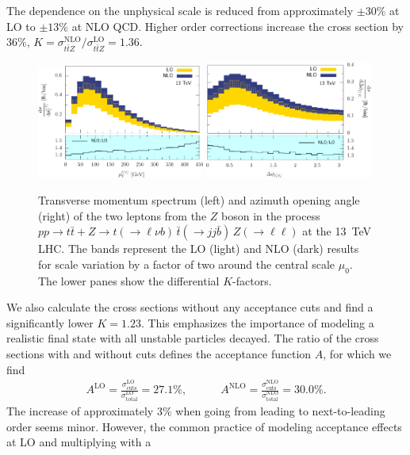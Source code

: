\documentclass{JHEP3}
\def\ttb{t\bar{t}}
\newcommand{\be}{\begin{eqnarray}}
\newcommand{\ee}{\end{eqnarray}}
\begin{document}
The dependence on the unphysical scale is reduced from approximately $\pm 30\%$ at LO to $\pm 13\%$ at NLO QCD.
Higher order corrections increase the cross section by 36\%, $K= \sigma_{\ttb Z}^\mathrm{NLO} \big/  \sigma_{\ttb Z}^\mathrm{LO}=1.36$.
\begin{figure}[t]
\centering 
\includegraphics[width=0.49\textwidth]{./LHC_53_Fig12.pdf}
\includegraphics[width=0.49\textwidth]{./LHC_53_Fig17.pdf}
\caption{\label{fig:ii} Transverse momentum spectrum (left) and azimuth opening angle (right) of the two leptons from the $Z$ boson 
in the process $pp \to \ttb + Z \to t(\to \ell \nu b) \, \bar{t} (\to jj \bar{b}) \, Z(\to \ell \ell)$ at the 13~TeV LHC.
The bands represent the LO (light) and NLO (dark) results for scale variation by a factor of two around the central scale $\mu_0$.
The lower panes show the differential $K$-factors.
}
\end{figure}
We also calculate the cross sections without any acceptance cuts and
find a significantly lower $K=1.23$.  This emphasizes the importance
of modeling a realistic final state with all unstable particles
decayed.  The ratio of the cross sections with and without cuts
defines the acceptance function $A$, for which we find 
\be
  A^\mathrm{LO} =
  \frac{\sigma_{\mathrm{cuts}}^\mathrm{LO}}{\sigma_{\mathrm{total}}^\mathrm{LO}}
  = 27.1 \%, \quad\quad\quad A^\mathrm{NLO} =
  \frac{\sigma_{\mathrm{cuts}}^\mathrm{NLO}}{\sigma_{\mathrm{total}}^\mathrm{NLO}}
  = 30.0 \%.  
\ee 
The increase of approximately $3\%$ when going from
leading to next-to-leading order seems minor.  However, the common
practice of modeling acceptance effects at LO and multiplying with a
\end{document}
